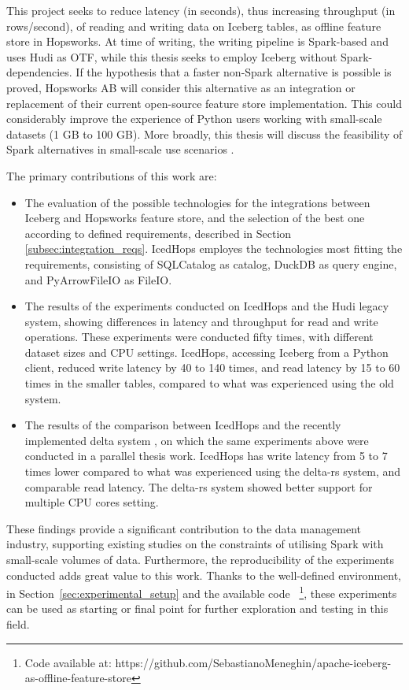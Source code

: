 This project seeks to reduce latency (in seconds), thus increasing throughput (in rows/second), of reading and writing data on Iceberg tables, as offline feature store in Hopsworks. At time of writing, the writing pipeline is Spark-based and uses Hudi as \gls{OTF}, while this thesis seeks to employ Iceberg without Spark-dependencies. If the hypothesis that a faster non-Spark alternative is possible is proved, Hopsworks AB will consider this alternative as an integration or replacement of their current open-source feature store implementation. This could considerably improve the experience of Python users working with small-scale datasets (1 GB to 100 GB). More broadly, this thesis will discuss the feasibility of Spark alternatives in small-scale use scenarios \cite{manfrediReducingReadWrite2024}.

The primary contributions of this work are:
\begin{itemize}
    \item The evaluation of the possible technologies for the integrations between Iceberg and Hopsworks feature store, and the selection of the best one according to defined requirements, described in Section \ref{subsec:integration_reqs}. IcedHops employes the technologies most fitting the requirements, consisting of SQLCatalog as catalog, DuckDB as query engine, and PyArrowFileIO as FileIO.
    \item The results of the experiments conducted on IcedHops and the Hudi legacy system, showing differences in latency and throughput for read and write operations. These experiments were conducted fifty times, with different dataset sizes and \gls{CPU} settings. IcedHops, accessing Iceberg from a Python client, reduced write latency by 40 to 140 times, and read latency by 15 to 60 times in the smaller tables, compared to what was experienced using the old system.
    \item The results of the comparison between IcedHops and the recently implemented delta system \cite{manfrediReducingReadWrite2024}, on which the same experiments above were conducted in a parallel thesis work. IcedHops has write latency from 5 to 7 times lower compared to what was experienced using the delta-rs system, and comparable read latency. The delta-rs system showed better support for multiple \gls{CPU} cores setting.
\end{itemize}

These findings provide a significant contribution to the data management industry, supporting existing studies on the constraints of utilising Spark with small-scale volumes of data. Furthermore, the reproducibility of the experiments conducted adds great value to this work. Thanks to the well-defined environment, in Section~\ref{sec:experimental_setup} and the available code ~\footnote{Code available at: https://github.com/SebastianoMeneghin/apache-iceberg-as-offline-feature-store}, these experiments can be used as starting or final point for further exploration and testing in this field. 